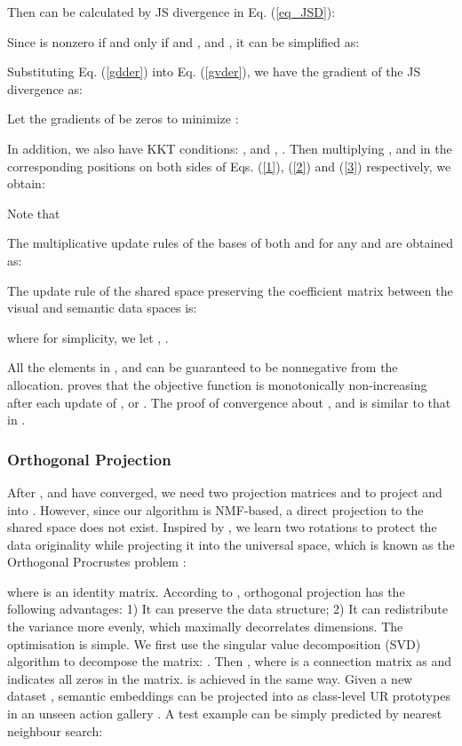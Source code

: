 \documentclass[10pt,twocolumn,letterpaper]{article}
\begin{document}
Then  can be calculated by JS divergence in Eq. (\ref{eq_JSD}):


Since  is nonzero if and only if  and , and , it can be simplified as:


Substituting Eq. (\ref{gdder}) into Eq. (\ref{gvder}), we have the gradient of the JS divergence as:


Let the gradients of  be zeros to minimize :






In addition, we also have KKT conditions: ,  and , . Then multiplying ,  and  in the corresponding positions on both sides of Eqs. (\ref{1}), (\ref{2}) and (\ref{3}) respectively, we obtain:




Note that



The multiplicative update rules of the bases of both  and  for any  and  are obtained as:


The update rule of the shared space preserving the coefficient matrix  between the visual and semantic data spaces is:

where for simplicity, we let , .

All the elements in ,  and  can be guaranteed to be nonnegative from the allocation. \cite{lee2001algorithms} proves that the objective function is monotonically non-increasing after each update of ,  or . The proof of convergence about ,  and  is similar to that in \cite{zheng2011dimensionality,cai2011graph}.

\subsubsection{Orthogonal Projection}
After ,  and  have converged, we need two projection matrices  and  to project  and  into . However, since our algorithm is NMF-based, a direct projection to the shared space does not exist. Inspired by \cite{cai2007spectral}, we learn two rotations to protect the data originality while projecting it into the universal space, which is known as the Orthogonal Procrustes problem \cite{schonemann1966generalized}:

where  is an identity matrix. According to \cite{zhang2015fast}, orthogonal projection has the following advantages: 1) It can preserve the data structure; 2) It can redistribute the variance more evenly, which maximally decorrelates dimensions. The optimisation is simple. We first use the singular value decomposition (SVD) algorithm to decompose the matrix: . Then , where  is a connection matrix as  and  indicates all zeros in the matrix.  is achieved in the same way. Given a new dataset , semantic embeddings  can be projected into  as class-level UR prototypes in an unseen action gallery . A test example  can be simply predicted by nearest neighbour search:
\end{document}

